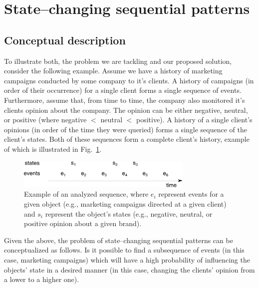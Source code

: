 \documentclass[runningheads,a4paper]{llncs}
\begin{document}
\section{State--changing sequential patterns}
\label{sec:main}

\subsection{Conceptual description}
To illustrate both, the problem we are tackling and our proposed solution, consider the following example.
Assume we have a history of marketing campaigns conducted by some company to it's clients.
A history of campaigns (in order of their occurrence) for a single client forms a single sequence of events.
Furthermore, assume that, from time to time, the company also monitored it's clients opinion about the company.
The opinion can be either negative, neutral, or positive (where negative $<$ neutral $<$ positive).
A history of a single client's opinions (in order of the time they were queried) forms a single sequence of the client's states.
Both of these sequences form a complete client's history, example of which is illustrated in Fig.~\ref{fig:example}.

\begin{figure}[!ht]
	\centering
		\includegraphics[width=0.75\textwidth]{images/example}
	\caption{Example of an analyzed sequence, where $e_i$ represent events for a given object (e.g., marketing campaigns directed at a given client) and $s_i$ represent the object's states (e.g., negative, neutral, or positive opinion about a given brand).}
	\label{fig:example}
\end{figure}

Given the above, the problem of state--changing sequential patterns can be conceptualized as follows.
Is it possible to find a subsequence of events (in this case, marketing campaigns) which will have a high probability of influencing the objects' state in a desired manner (in this case, changing the clients' opinion from a lower to a higher one).
\end{document}
